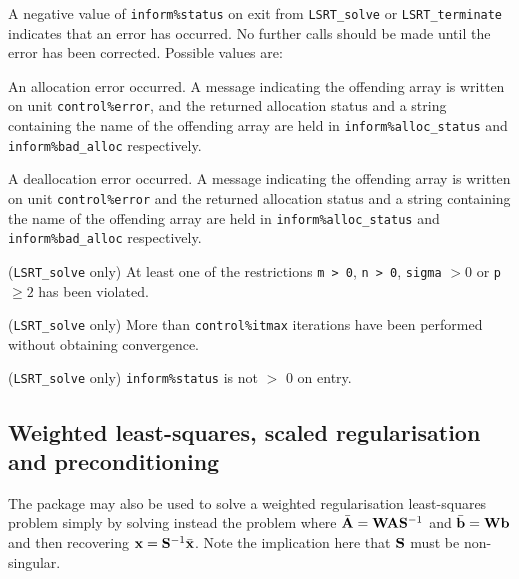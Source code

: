 \documentclass{galahad}
\newcommand{\packagename}{LS\-RT}
\begin{document}

\galerrors
A negative value of  {\tt inform\%status} on exit from 
{\tt \packagename\_solve}
or 
{\tt \packagename\_terminate}
indicates that an error has occurred. No further calls should be made
until the error has been corrected. Possible values are:

\begin{description}
 An allocation error occurred. A message indicating 
the offending 
array is written on unit {\tt control\%error}, and the returned allocation 
status and a string containing the name of the offending array
are held in {\tt inform\%alloc\_\-status}
and {\tt inform\%bad\_alloc} respectively.

 A deallocation error occurred. 
A message indicating the offending 
array is written on unit {\tt control\%error} and the returned allocation 
status and a string containing the name of the offending array
are held in {\tt inform\%alloc\_\-status}
and {\tt inform\%bad\_alloc} respectively.

 ({\tt \packagename\_solve} only) 
At least one of the restrictions 
{\tt m > 0}, 
{\tt n > 0},
{\tt sigma} $> 0$
or
{\tt p} $\geq 2$
has been violated.

 ({\tt \packagename\_solve} only) More than  
{\tt control\%itmax} iterations have been performed without obtaining 
convergence. 
 
 ({\tt \packagename\_solve} only)  {\tt inform\%status} is
not $>$ 0 on entry.
 
\end{description} 


\subsection{Weighted least-squares, scaled regularisation and preconditioning}
The package may also be used to solve a weighted regularisation 
least-squares problem
simply by solving instead the problem
where $\bar{{\mathbf{A}}} = {\mathbf{W}} {\mathbf{A}} {\mathbf{S}}^{-1}$ and 
$\bar{{\mathbf{b}}} = {\mathbf{W}} {\mathbf{b}}$
and then recovering ${\mathbf{x}} = {\mathbf{S}}^{-1} \bar{{\mathbf{x}}}$. Note the implication here
that ${\mathbf{S}}$ must be non-singular.
\end{document}
